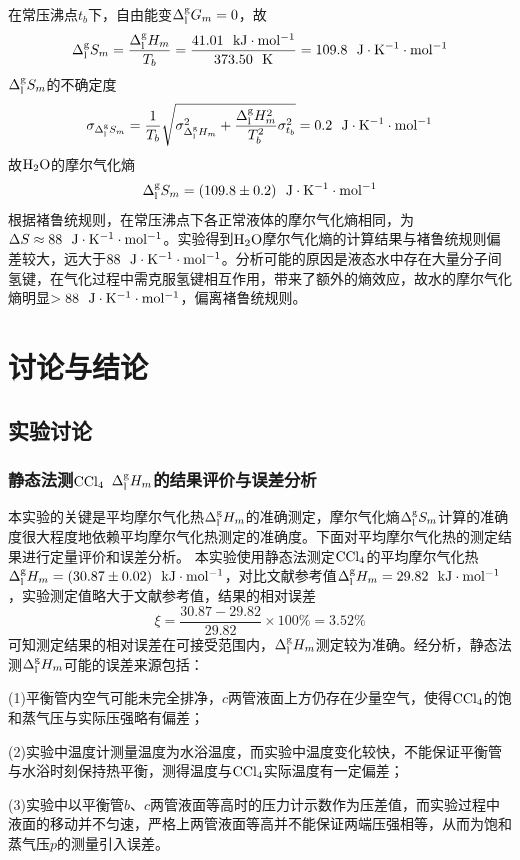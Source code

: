 \documentclass[12pt]{article}
\begin{document}
在常压沸点$t_{b}$下，自由能变$\Delta^{\rm g}_{\rm l}G_{m}=0$，故
$$
\Delta^{\rm g}_{\rm l}S_{m}=\frac{\Delta^{\rm g}_{\rm l}H_{m}}{T_{b}}=\frac{41.01\ \ {\rm kJ\cdot mol^{-1}}}{373.50\ \ {\rm K}}=109.8\ \ {\rm J\cdot K^{-1} \cdot mol^{-1}}
$$
$\Delta^{\rm g}_{\rm l}S_{m}$的不确定度
$$
\sigma_{\Delta^{\rm g}_{\rm l}S_{m}}=\frac{1}{T_{b}} \sqrt{\sigma^{2}_{\Delta^{\rm g}_{\rm l}H_{m}}+\frac{\Delta^{\rm g}_{\rm l}H_{m}^{2}}{T_{b}^{2}}\sigma^{2}_{t_{b}}}=0.2\ \ {\rm J\cdot K^{-1}\cdot mol^{-1}}
$$
故$\rm H_{2}O$的摩尔气化熵
$$
\Delta^{\rm g}_{\rm l}S_{m}=(109.8\pm 0.2)\ \ {\rm J\cdot K^{-1} \cdot mol^{-1}}
$$
根据褚鲁统规则，在常压沸点下各正常液体的摩尔气化熵相同，为$\Delta S\approx 88\ \ {\rm J\cdot K^{-1}\cdot mol^{-1}}$。实验得到$\rm H_{2}O$摩尔气化熵的计算结果与褚鲁统规则偏差较大，远大于$88\ \ {\rm J\cdot K^{-1}\cdot mol^{-1}}$。分析可能的原因是液态水中存在大量分子间氢键，在气化过程中需克服氢键相互作用，带来了额外的熵效应，故水的摩尔气化熵明显$>88\ \ {\rm J\cdot K^{-1}\cdot mol^{-1}}$，偏离褚鲁统规则。
 	 \section{讨论与结论}
		\subsection{实验讨论}
 			\subsubsection{静态法测$\rm CCl_{4}$ $\Delta^{\rm g}_{\rm l}H_{m}$的结果评价与误差分析}
本实验的关键是平均摩尔气化热$\Delta^{\rm g}_{\rm l}H_{m}$的准确测定，摩尔气化熵$\Delta^{\rm g}_{\rm l}S_{m}$计算的准确度很大程度地依赖平均摩尔气化热测定的准确度。下面对平均摩尔气化热的测定结果进行定量评价和误差分析。
本实验使用静态法测定$\rm CCl_{4}$的平均摩尔气化热$\Delta^{\rm g}_{\rm l}H_{m}=(30.87\pm 0.02)\ \ {\rm kJ\cdot mol^{-1}}$，对比文献参考值\citealp{crc}$\Delta^{\rm g}_{\rm l}H_{m}=29.82\ \ {\rm kJ\cdot mol^{-1}}$，实验测定值略大于文献参考值，结果的相对误差
$$
\xi=\frac{30.87-29.82}{29.82}\times 100\%=3.52\%
$$
可知测定结果的相对误差在可接受范围内，$\Delta^{\rm g}_{\rm l}H_{m}$测定较为准确。经分析，静态法测$\Delta^{\rm g}_{\rm l}H_{m}$可能的误差来源包括：
\par 
(1)平衡管内空气可能未完全排净，$c$两管液面上方仍存在少量空气，使得$\rm CCl_{4}$的饱和蒸气压与实际压强略有偏差；\par 
(2)实验中温度计测量温度为水浴温度，而实验中温度变化较快，不能保证平衡管与水浴时刻保持热平衡，测得温度与$\rm CCl_{4}$实际温度有一定偏差；\par 
(3)实验中以平衡管$b$、$c$两管液面等高时的压力计示数作为压差值，而实验过程中液面的移动并不匀速，严格上两管液面等高并不能保证两端压强相等，从而为饱和蒸气压$p$的测量引入误差。\par 
\end{document}
